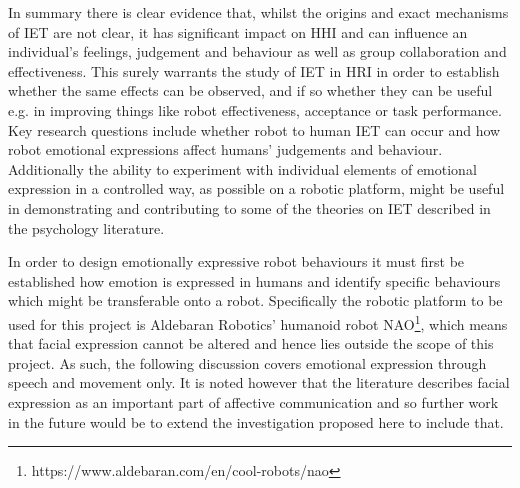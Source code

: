 \documentclass[11pt]{article}
\begin{document}
In summary there is clear evidence that, whilst the origins and exact mechanisms of IET are not clear, it has significant impact on HHI and can influence an individual's feelings, judgement and behaviour as well as group collaboration and effectiveness. This surely warrants the study of IET in HRI in order to establish whether the same effects can be observed, and if so whether they can be useful e.g. in improving things like robot effectiveness, acceptance or task performance. Key research questions include whether robot to human IET can occur and how robot emotional expressions affect humans' judgements and behaviour. Additionally the ability to experiment with individual elements of emotional expression in a controlled way, as possible on a robotic platform, might be useful in demonstrating and contributing to some of the theories on IET described in the psychology literature. 

In order to design emotionally expressive robot behaviours it must first be established how emotion is expressed in humans and identify specific behaviours which might be transferable onto a robot. Specifically the robotic platform to be used for this project is Aldebaran Robotics' humanoid robot NAO\footnote{https://www.aldebaran.com/en/cool-robots/nao}, which means that facial expression cannot be altered and hence lies outside the scope of this project.  As such, the following discussion covers emotional expression through speech and movement only. It is noted however that the literature describes facial expression as an important part of affective communication and so further work in the future would be to extend the investigation proposed here to include that.
\end{document}
